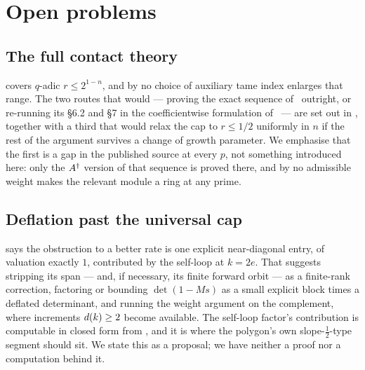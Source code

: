 
\section{Open problems}
\label{sec:remarks}

\subsection*{The full contact theory}

 covers $q$-adic $r \le 2^{1-n}$, and by
 no choice of auxiliary tame index enlarges that
range. The two routes that would --- proving the exact sequence of~\cite[\S6.2]{kramermillerupton2021newton} outright, or re-running its \S6.2 and \S7
in the coefficientwise formulation of~\cite{kramermiller2020abelian} ---
are set out in , together with a third that would
relax the cap to $r \le 1/2$ uniformly in $n$ if the rest of the argument
survives a change of growth parameter. We emphasise that the first is a gap
in the published source at every $p$, not something introduced here: only
the $A^{\dagger}$ version of that sequence is proved there, and by
 no admissible weight makes the relevant module a ring
at any prime.

\subsection*{Deflation past the universal cap}

 says the obstruction to a better rate is one explicit
near-diagonal entry, of valuation exactly $1$, contributed by the self-loop
at $k = 2e$. That suggests stripping its span --- and, if necessary, its
finite forward orbit --- as a finite-rank correction, factoring or bounding
$\det(1 - Ms)$ as a small explicit block times a deflated determinant, and
running the weight argument on the complement, where increments $d(k)
\ge 2$ become available. The self-loop factor's contribution is computable
in closed form from , and it is where the polygon's
own slope-$\tfrac12$-type segment should sit. We state this as a proposal;
we have neither a proof nor a computation behind it.

